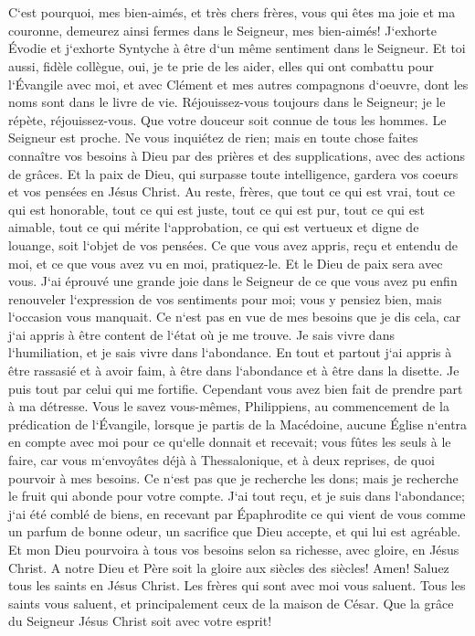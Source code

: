 \chapter{}

\verse C`est pourquoi, mes bien-aimés, et très chers frères, vous qui êtes ma joie et ma couronne, demeurez ainsi fermes dans le Seigneur, mes bien-aimés! 
\verse J`exhorte Évodie et j`exhorte Syntyche à être d`un même sentiment dans le Seigneur. 
\verse Et toi aussi, fidèle collègue, oui, je te prie de les aider, elles qui ont combattu pour l`Évangile avec moi, et avec Clément et mes autres compagnons d`oeuvre, dont les noms sont dans le livre de vie. 
\verse Réjouissez-vous toujours dans le Seigneur; je le répète, réjouissez-vous. 
\verse Que votre douceur soit connue de tous les hommes. Le Seigneur est proche. 
\verse Ne vous inquiétez de rien; mais en toute chose faites connaître vos besoins à Dieu par des prières et des supplications, avec des actions de grâces. 
\verse Et la paix de Dieu, qui surpasse toute intelligence, gardera vos coeurs et vos pensées en Jésus Christ. 
\verse Au reste, frères, que tout ce qui est vrai, tout ce qui est honorable, tout ce qui est juste, tout ce qui est pur, tout ce qui est aimable, tout ce qui mérite l`approbation, ce qui est vertueux et digne de louange, soit l`objet de vos pensées. 
\verse Ce que vous avez appris, reçu et entendu de moi, et ce que vous avez vu en moi, pratiquez-le. Et le Dieu de paix sera avec vous. 
\verse J`ai éprouvé une grande joie dans le Seigneur de ce que vous avez pu enfin renouveler l`expression de vos sentiments pour moi; vous y pensiez bien, mais l`occasion vous manquait. 
\verse Ce n`est pas en vue de mes besoins que je dis cela, car j`ai appris à être content de l`état où je me trouve. 
\verse Je sais vivre dans l`humiliation, et je sais vivre dans l`abondance. En tout et partout j`ai appris à être rassasié et à avoir faim, à être dans l`abondance et à être dans la disette. 
\verse Je puis tout par celui qui me fortifie. 
\verse Cependant vous avez bien fait de prendre part à ma détresse. 
\verse Vous le savez vous-mêmes, Philippiens, au commencement de la prédication de l`Évangile, lorsque je partis de la Macédoine, aucune Église n`entra en compte avec moi pour ce qu`elle donnait et recevait; 
\verse vous fûtes les seuls à le faire, car vous m`envoyâtes déjà à Thessalonique, et à deux reprises, de quoi pourvoir à mes besoins. 
\verse Ce n`est pas que je recherche les dons; mais je recherche le fruit qui abonde pour votre compte. 
\verse J`ai tout reçu, et je suis dans l`abondance; j`ai été comblé de biens, en recevant par Épaphrodite ce qui vient de vous comme un parfum de bonne odeur, un sacrifice que Dieu accepte, et qui lui est agréable. 
\verse Et mon Dieu pourvoira à tous vos besoins selon sa richesse, avec gloire, en Jésus Christ. 
\verse A notre Dieu et Père soit la gloire aux siècles des siècles! Amen! 
\verse Saluez tous les saints en Jésus Christ. Les frères qui sont avec moi vous saluent. 
\verse Tous les saints vous saluent, et principalement ceux de la maison de César. 
\verse Que la grâce du Seigneur Jésus Christ soit avec votre esprit! 
